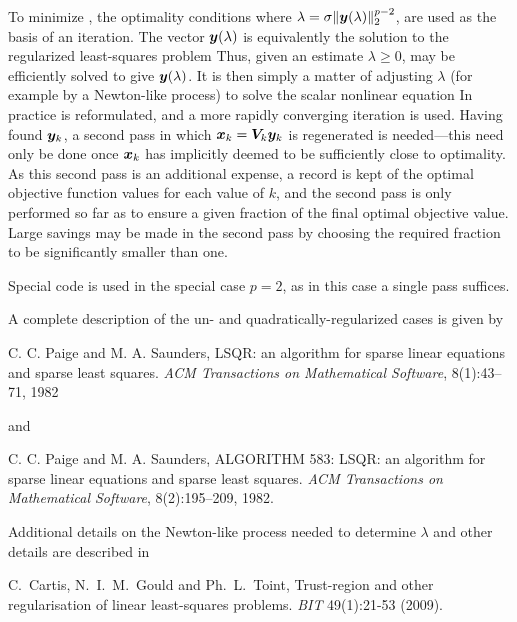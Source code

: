 \documentclass{galahad}
\begin{document}
To minimize , the optimality conditions
where $\lambda = \sigma \|{\bm{y}}(\lambda)\|_2^{p-2}$,
are used as the basis of an iteration.
The vector ${\bm{y}}(\lambda)$ is equivalently the solution to the
regularized least-squares problem
Thus, given an estimate $\lambda \geq 0$,  may be efficiently
solved to give ${\bm{y}}(\lambda)$.
It is then simply a matter of adjusting $\lambda$
(for example by a Newton-like process) to solve the scalar nonlinear equation
In practice  is reformulated, and a more rapidly converging iteration is
used. Having found  ${\bm{y}}_k$, a second pass in which
${\bm{x}}_k = {\bm{V}}_k {\bm{y}}_k$ is regenerated is needed---this need only be done
once ${\bm{x}}_k$ has implicitly deemed to be sufficiently close to optimality.
As this second pass is an additional expense, a record is kept of the
optimal objective function values for each value of $k$, and the second
pass is only performed so far as to ensure a given fraction of the
final optimal objective value. Large savings may be made in the second
pass by choosing the required fraction to be significantly smaller than one.

Special code is used in the special case $p=2$, as in this case a single
pass suffices.

\galreferences
A complete description of the un- and quadratically-regularized
cases is given by
\vspace*{1mm}

\noindent
C. C. Paige and M. A. Saunders,
LSQR: an algorithm for sparse linear equations and sparse least  squares.
{\em ACM Transactions on Mathematical Software}, 8(1):43--71, 1982

\noindent
and

\noindent
C. C. Paige and M. A. Saunders,
ALGORITHM 583: LSQR: an algorithm for sparse linear equations and
  sparse least squares.
{\em ACM Transactions on Mathematical Software}, 8(2):195--209, 1982.

\noindent
Additional details on the Newton-like process needed to determine $\lambda$ and
other details are described in
\vspace*{1mm}

\noindent
C.\ Cartis, N.\ I.\ M.\ Gould and Ph.\ L.\ Toint,
Trust-region and other regularisation of linear
least-squares problems.
{\em BIT} 49(1):21-53 (2009).
\end{document}
